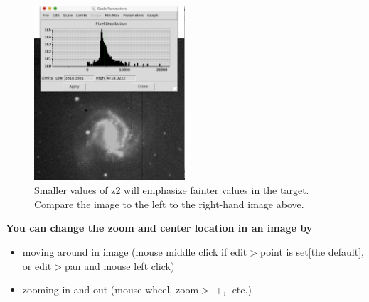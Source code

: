 \begin{figure}
		\includegraphics[width=0.5\textwidth]{inventing-color/z-small}
		\caption{Smaller values of z2 will emphasize fainter values in the target. Compare the image to the left to the right-hand image above.}\label{ic:fig:z-small}
\end{figure}

\textbf{You can change the zoom and center location in an image by} 
\begin{itemize}
\item moving around in image (mouse middle click if edit$>$point is set[the default], or edit$>$pan and mouse left click)
\item zooming in and out (mouse wheel, zoom$>$ +,- etc.)
\end{itemize}

